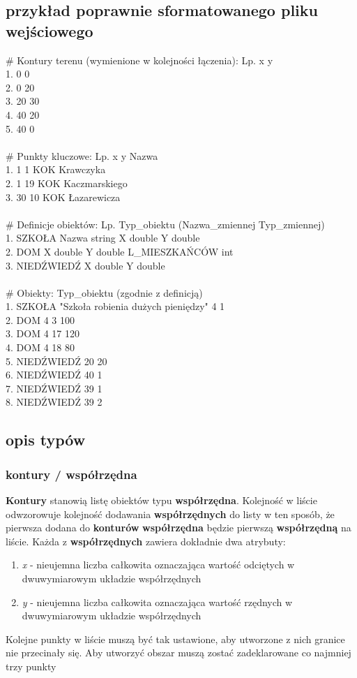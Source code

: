 \documentclass[hidelinks,10pt,a4paper]{article}
\begin{document}
\subsection{przykład poprawnie sformatowanego pliku wejściowego}
\# Kontury terenu (wymienione w kolejności łączenia): Lp. x y
\\1. 0 0
\\2. 0 20
\\3. 20 30
\\4. 40 20
\\5. 40 0
\\
\\
\# Punkty kluczowe: Lp. x y Nazwa
\\1. 1 1 KOK Krawczyka
\\2. 1 19 KOK Kaczmarskiego
\\3. 30 10 KOK Łazarewicza
\\
\\
\# Definicje obiektów: Lp. Typ\_obiektu (Nazwa\_zmiennej Typ\_zmiennej)
\\1. SZKOŁA Nazwa string X double Y double
\\2. DOM X double Y double L\_MIESZKAŃCÓW int
\\3. NIEDŹWIEDŹ X double Y double
\\
\\
\# Obiekty: Typ\_obiektu (zgodnie z definicją)
\\1. SZKOŁA "Szkoła robienia dużych pieniędzy" 4 1
\\2. DOM 4 3 100
\\3. DOM 4 17 120
\\4. DOM 4 18 80
\\5. NIEDŹWIEDŹ 20 20
\\6. NIEDŹWIEDŹ 40 1
\\7. NIEDŹWIEDŹ 39 1
\\8. NIEDŹWIEDŹ 39 2
\\
\subsection{opis typów}


\subsubsection{kontury / współrzędna}
\textbf{Kontury} stanowią listę obiektów typu \textbf{współrzędna}.
Kolejność w liście odwzorowuje kolejność dodawania \textbf{współrzędnych} do listy w ten sposób, że pierwsza dodana do \textbf{konturów} \textbf{współrzędna} będzie pierwszą \textbf{współrzędną} na liście.
Każda z \textbf{współrzędnych} zawiera dokładnie dwa atrybuty:
\begin{enumerate}
\item \textit{x} - nieujemna liczba całkowita oznaczająca wartość odciętych w dwuwymiarowym układzie współrzędnych
\item \textit{y} - nieujemna liczba całkowita oznaczająca wartość rzędnych w dwuwymiarowym układzie współrzędnych
\end{enumerate}
Kolejne punkty w liście muszą być tak ustawione, aby utworzone z nich granice nie przecinały się.
Aby utworzyć obszar muszą zostać zadeklarowane co najmniej trzy punkty
\end{document}
